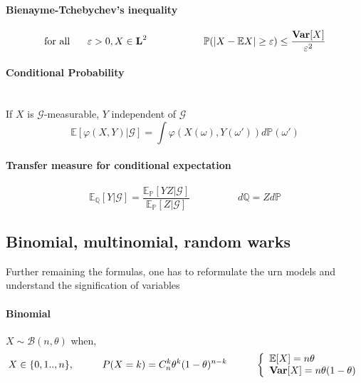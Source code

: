\documentclass[a4paper,10pt]{article}
\begin{document}
\paragraph{Bienayme-Tchebychev's inequality}
\[
\text{for all  } \hspace{5mm} \varepsilon > 0, X\in \textbf{L}^2 \hspace{20mm} \mathbb{P}(|X- \mathbb{E}X| \geq \varepsilon) \leq \frac{\textbf{Var}[X]}{\varepsilon ^2}
\]
\paragraph{Conditional Probability}\mbox{} \\
If $X$ is $\mathcal{G}$-measurable, $Y$ independent of $\mathcal{G}$
\[
\mathbb{E}[\varphi(X,Y)|\mathcal{G}] = \int \varphi(X(\omega),Y(\omega '))d\mathbb{P}(\omega ')
\]
\paragraph{Transfer measure for conditional expectation}
\[
\mathbb{E}_{\mathbb{Q}}[Y|\mathcal{G}] = 
\frac{\mathbb{E}_{\mathbb{P}}[YZ|\mathcal{G}]}{\mathbb{E}_{\mathbb{P}}[Z|\mathcal{G}]}
\hspace{2cm}
d\mathbb{Q} = Z d\mathbb{P}
\]

\subsection{Binomial, multinomial, random warks}
Further remaining the formulas, one has to reformulate the urn models and understand the signification of variables
\paragraph{Binomial} $X\sim \mathcal{B}(n,\theta)$ when,
\[
X \in \{0,1 .. , n\} , 
\hspace{10mm}
P(X=k)=C^k_n\theta ^k (1-\theta)^{n-k} 
\hspace{10mm}
\left\{
\begin{array}{l}
\mathbb{E}[X]=n\theta \\
\textbf{Var}[X]=n \theta (1-\theta) 
\end{array}\right.
\]
\end{document}
